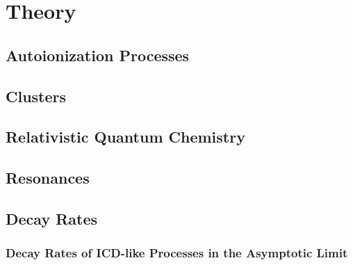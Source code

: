 \chapter{Theory}

\section{Autoionization Processes}
\section{Clusters}
\section{Relativistic Quantum Chemistry}
\section{Resonances}
 
\section{Decay Rates}
\subsection{Decay Rates of ICD-like Processes in the Asymptotic Limit}

